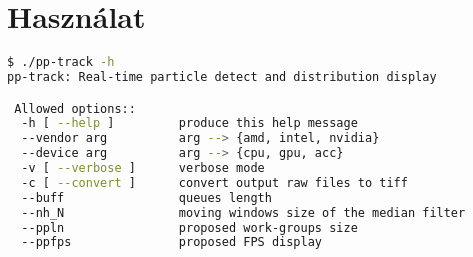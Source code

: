 \section{Használat}
\begin{lstlisting}[language=bash]
$ ./pp-track -h
pp-track: Real-time particle detect and distribution display

 Allowed options::
  -h [ --help ]         produce this help message
  --vendor arg          arg --> {amd, intel, nvidia}
  --device arg          arg --> {cpu, gpu, acc}
  -v [ --verbose ]      verbose mode
  -c [ --convert ]      convert output raw files to tiff
  --buff                queues length
  --nh_N                moving windows size of the median filter
  --ppln                proposed work-groups size
  --ppfps               proposed FPS display 
\end{lstlisting}
